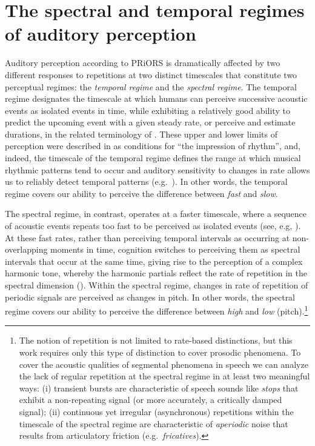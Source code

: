 \section{The spectral and temporal regimes of auditory perception}\label{sec:spectemp}

Auditory perception according to PRiORS is dramatically affected by two different responses to repetitions at two distinct timescales that constitute two perceptual regimes: the \emph{temporal regime} and the \emph{spectral regime}. The temporal regime designates the timescale at which humans can perceive successive acoustic events as isolated events in time, while exhibiting a relatively good ability to predict the upcoming event with a given steady rate, or perceive and estimate durations, in the related terminology of \citet{fraisse1984perception}. These upper and lower limits of perception were described in \citet[321]{macdougall1903structure} as conditions for \enquote{the impression of rhythm}, and, indeed, the timescale of the temporal regime defines the range at which musical rhythmic patterns tend to occur and auditory sensitivity to changes in rate allows us to reliably detect temporal patterns (e.g.~\citealt{fraisse1984perception, farbood2013temporal, repp2005sensorimotor}). In other words, the temporal regime covers our ability to perceive the difference between \emph{fast} and \emph{slow}.

The spectral regime, in contrast, operates at a faster timescale, where a sequence of acoustic events repeats too fast to be perceived as isolated events (see, e.g, \citealt{miller1948perception, broadbent1959auditory, efron1973conversation, hirsh1959auditory}). At these fast rates, rather than perceiving temporal intervals as occurring at non-overlapping moments in time, cognition switches to perceiving them as spectral intervals that occur at the same time, giving rise to the perception of a complex harmonic tone, whereby the harmonic partials reflect the rate of repetition in the spectral dimension (\citealt{flanagan1960pitch, stockhausen1959how, warren1982auditory}). Within the spectral regime, changes in rate of repetition of periodic signals are perceived as changes in pitch.
In other words, the spectral regime covers our ability to perceive the difference between \emph{high} and \emph{low} (pitch).\footnote{The notion of repetition is not limited to rate-based distinctions, but this work requires only this type of distinction to cover prosodic phenomena. To cover the acoustic qualities of segmental phenomena in speech we can analyze the lack of regular repetition at the spectral regime in at least two meaningful ways: (i) transient bursts are characteristic of speech sounds like \emph{stops} that exhibit a non-repeating signal (or more accurately, a critically damped signal); (ii) continuous yet irregular (asynchronous) repetitions within the timescale of the spectral regime are characteristic of \emph{aperiodic} noise that results from articulatory friction (e.g.~\emph{fricatives}).}

